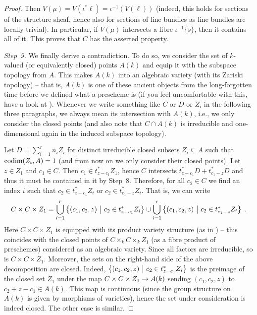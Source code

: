 \documentclass[a4paper,parskip=half,numbers=enddot, DIV=12]{scrreprt}
\begin{document}
\begin{proof}
	Then $V(\mu)=V(\iota^*\ell)=\iota^{-1}(V(\ell))$ (indeed, this holds for sections of the structure sheaf, hence also for sections of line bundles as line bundles are locally trivial). In particular, if $V(\mu)$ intersects a fibre $\iota^{-1}\{s\}$, then it contains all of it. This proves that $C$ has the asserted property.
	
	\emph{Step~9.} We finally derive a contradiction. To do so, we consider the set of $k$-valued (or equivalently closed) points $A(k)$ and equip it with the subspace topology from $A$. This makes $A(k)$ into an algebraic variety (with its Zariski topology) -- that is, $A(k)$ is one of these ancient objects from the long-forgotten time before we defined what a prescheme is (if you feel uncomfortable with this, have a look at \cite[Section~2.3]{alggeo1}). Whenever we write something like $C$ or $D$ or $Z_i$ in the following three paragraphs, we always mean its intersection with $A(k)$, i.e., we only consider the closed points (and also note that $C\cap A(k)$ is irreducible and one-dimensional again in the induced subspace topology).
	
	Let $D=\sum_{i=1}^rn_iZ_i$ for distinct irreducible closed subsets $Z_i\subseteq A$ such that $\operatorname{codim}(Z_i,A)=1$ (and from now on we only consider their closed points). Let $z\in Z_1$ and $c_1\in C$. Then $c_1\in t_{z-c_1}^*Z_1$, hence $C$ intersects $t_{z-c_1}^*D+t_{c_1-z}^*D$ and thus it must be contained in it by Step~8. Therefore, for all $c_2\in C$ we find an index $i$ such that $c_2\in t_{z-c_1}^*Z_i$ or $c_2\in t_{c_1-z}^*Z_i$. That is, we can write
	\begin{align}\lbl{eq:CCZdecomposition}
		C\times C\times Z_1=\bigcup_{i=1}^r\left\{(c_1,c_2,z)\st c_2\in t_{z-c_1}^*Z_i\right\}\cup \bigcup_{i=1}^r\left\{(c_1,c_2,z)\st c_2\in t_{c_1-z}^*Z_i\right\}\;.
	\end{align}
	Here $C\times C\times Z_1$ is equipped with its product variety structure (as in \cite[Proposition~2.2.6]{alg1}) -- this coincides with the closed points of $C\times_kC\times_kZ_1$ (as a fibre product of preschemes) considered as an algebraic variety. Since all factors are irreducible, so is $C\times C\times Z_1$. Moreover, the sets on the right-hand side of the above decomposition  are closed. Indeed, $\left\{(c_1,c_2,z)\ \middle|\  c_2\in t_{z-c_1}^*Z_i\right\}$ is the preimage of the closed set $Z_1$ under the map $C\times C\times Z_1\morphism A(k)$ sending $(c_1,c_2,z)$ to $c_2+z-c_1\in A(k)$. This map is continuous (since the group structure on $A(k)$ is given by morphisms of varieties), hence the set under consideration is indeed closed. The other case is similar.
	

\end{proof}
\end{document}
